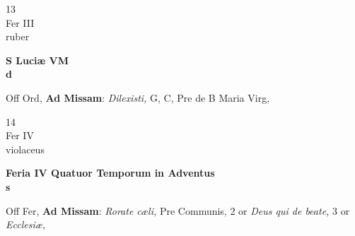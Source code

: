 \documentclass[10pt, openany]{book}
\begin{document}
        \begin{center}
            \begin{minipage}{3.5in}
                \vspace{2em}
                \begin{minipage}{0.5in}
                    {\Huge 13} \\
                    {\normalsize Fer III} \\
                    {\normalsize ruber}
                \end{minipage}
                \begin{minipage}{3.0in}
                    \textbf{ \large S Luciæ VM \\
                    \textnormal{\normalsize d}} \\ 
                \end{minipage}
                \begin{justify}Off Ord, \textbf{Ad Missam}: \textit{Dilexisti,} G, C, Pre de B Maria Virg,  
                \end{justify}
            \end{minipage}
        \end{center}
    
        \begin{center}
            \begin{minipage}{3.5in}
                \vspace{2em}
                \begin{minipage}{0.5in}
                    {\Huge 14} \\
                    {\normalsize Fer IV} \\
                    {\normalsize violaceus}
                \end{minipage}
                \begin{minipage}{3.0in}
                    \textbf{ \large Feria IV Quatuor Temporum in Adventus \\
                    \textnormal{\normalsize s}} \\ 
                \end{minipage}
                \begin{justify}Off Fer, \textbf{Ad Missam}: \textit{Rorate cæli,} Pre Communis, 2 or \textit{Deus qui de beate,} 3 or \textit{Ecclesiæ,}  
                \end{justify}
            \end{minipage}
        \end{center}
    
\end{document}
